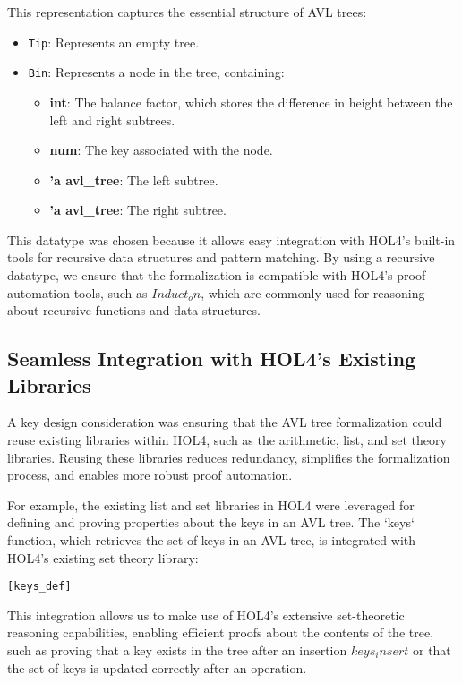 This representation captures the essential structure of AVL trees:
\begin{itemize}
    \item \texttt{Tip}: Represents an empty tree.
    \item \texttt{Bin}: Represents a node in the tree, containing:
        \begin{itemize}
            \item \textbf{int}: The balance factor, which stores the difference in height between the left and right subtrees.
            \item \textbf{num}: The key associated with the node.
            \item \textbf{'a avl\_tree}: The left subtree.
            \item \textbf{'a avl\_tree}: The right subtree.
        \end{itemize}
\end{itemize}

This datatype was chosen because it allows easy integration with HOL4’s built-in tools for recursive data structures and pattern matching. By using a recursive datatype, we ensure that the formalization is compatible with HOL4's proof automation tools, such as  \( Induct_on \), which are commonly used for reasoning about recursive functions and data structures.

\subsection{Seamless Integration with HOL4’s Existing Libraries}

A key design consideration was ensuring that the AVL tree formalization could reuse existing libraries within HOL4, such as the arithmetic, list, and set theory libraries. Reusing these libraries reduces redundancy, simplifies the formalization process, and enables more robust proof automation.

For example, the existing list and set libraries in HOL4 were leveraged for defining and proving properties about the keys in an AVL tree. The `keys` function, which retrieves the set of keys in an AVL tree, is integrated with HOL4’s existing set theory library:

\begin{alltt}
	[keys_def]
\end{alltt}


This integration allows us to make use of HOL4’s extensive set-theoretic reasoning capabilities, enabling efficient proofs about the contents of the tree, such as proving that a key exists in the tree after an insertion \(keys_insert\) or that the set of keys is updated correctly after an operation.

